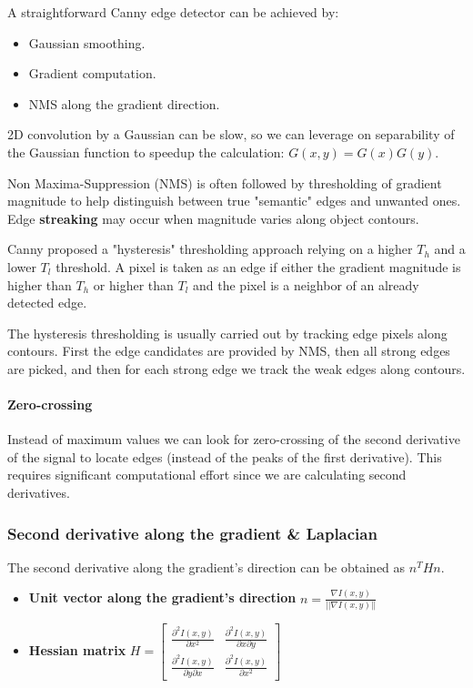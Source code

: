 \documentclass{article}
\begin{document}
A straightforward Canny edge detector can be achieved by:
\begin{itemize}
  \item Gaussian smoothing.
  \item Gradient computation.
  \item NMS along the gradient direction.
\end{itemize}

2D convolution by a Gaussian can be slow, so we can leverage on separability of the Gaussian function to speedup the calculation: $G(x,y) = G(x)G(y)$.

Non Maxima-Suppression (NMS) is often followed by thresholding of gradient magnitude to help distinguish between true "semantic" edges and unwanted ones.
Edge \textbf{streaking} may occur when magnitude varies along object contours.

Canny proposed a "hysteresis" thresholding approach relying on a higher $T_h$ and a lower $T_l$ threshold.
A pixel is taken as an edge if either the gradient magnitude is higher than $T_h$ or higher than $T_l$ and the pixel is a neighbor of an already detected edge.

The hysteresis thresholding is usually carried out by tracking edge pixels along contours.
First the edge candidates are provided by NMS, then all strong edges are picked, and then for each strong edge we track the weak edges along contours.

\paragraph{Zero-crossing}
Instead of maximum values we can look for zero-crossing of the second derivative of the signal to locate edges (instead of the peaks of the first derivative).
This requires significant computational effort since we are calculating second derivatives.

\subsubsection{Second derivative along the gradient \& Laplacian}
The second derivative along the gradient's direction can be obtained as $n^THn$.

\begin{itemize}
  \item \textbf{Unit vector along the gradient's direction} $n = \frac{\nabla I(x,y)}{||\nabla I(x,y)||}$
  \item \textbf{Hessian matrix} $H =  \begin{bmatrix} \frac{\partial^2 I(x,y)}{\partial x^2} & \frac{\partial^2 I(x,y)}{\partial x \partial y} \\ \frac{\partial^2 I(x,y)}{\partial y \partial x} & \frac{\partial^2 I(x,y)}{\partial x^2} \end{bmatrix} $
\end{itemize}
\end{document}

